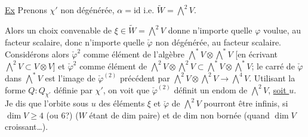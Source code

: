 
\uline{Ex} Prenons $\chi'$ non dégénérée,  $\alpha=\mathrm{id}$ i.e. $\widetilde W=\bigwedge^2V$.

Alors un choix convenable de $\xi\in\widetilde W=\bigwedge^2V$ donne n'importe quelle $\varphi$ voulue, au facteur scalaire, donc n'importe quelle $\check\varphi$  non dégénérée, au facteur scalaire. Considérons alors $\check\varphi^2$ comme élément de  l'algèbre $\bigwedge^*V\otimes\bigwedge^*V$ [en écrivant $\bigwedge^2V\subset V\otimes V$] et $\check\varphi^2$ comme élément de $\bigwedge^2V\otimes\bigwedge^2V\subset\bigwedge^*V\otimes\bigwedge^*V$; le carré de $\check\varphi$ dans $\bigwedge^*V$  est l'image de $\check\varphi^{(2)}$ précédent par $\bigwedge^2V\otimes\bigwedge^2V\longrightarrow\bigwedge^4V$. Utilisant la forme $Q:Q_{\chi'}$ définie par $\chi'$, on voit que $\check\varphi^{(2)}$ définit un endom de $\bigwedge^2V$, \uline{soit $u$}. Je dis que l'orbite sous $u$ des éléments $\xi$ et $\check\varphi$ de $\bigwedge^2V$ pourront être infinis, si $\dim V\geq4$ (ou $6$?) ($W$ étant de dim paire) et   de dim non bornée (quand $\dim V$ croissant\ldots).
\deleted{$\unsure{\xi}$}
